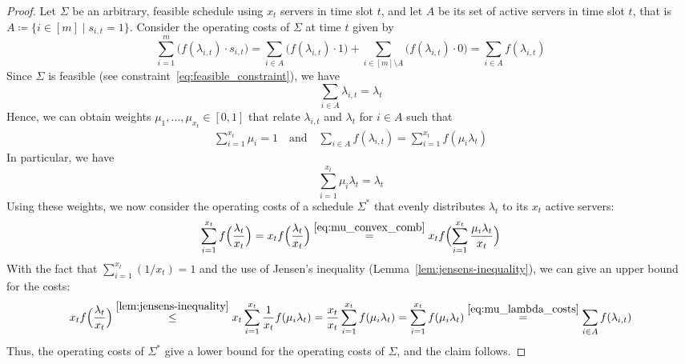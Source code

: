 \begin{proof}
Let $\Sigma$ be an arbitrary, feasible schedule using $x_t$ servers in time slot $t$, and let $A$ be its set of active servers in time slot $t$, that is $A\coloneqq\{i\in[m]\mid s_{i,t}=1\}$.
Consider the operating costs of $\Sigma$ at time $t$ given by
\begin{equation*}
	\sum\limits_{i=1}^{m}\bigl(f(\lambda_{i,t})\cdot s_{i,t}\bigr)=\sum\limits_{i\in A}\bigl(f(\lambda_{i,t})\cdot1\bigr)+\sum\limits_{i\in [m]\setminus A}\bigl(f(\lambda_{i,t})\cdot0\bigr)=\sum\limits_{i\in A}f(\lambda_{i,t})
\end{equation*}
Since $\Sigma$ is feasible (see constraint~\eqref{eq:feasible_constraint}), we have 
\begin{equation*}
	\sum\limits_{i\in A}\lambda_{i,t}=\lambda_t
\end{equation*}
Hence, we can obtain weights $\mu_1,\ldots,\mu_{x_t}\in[0,1]$ that relate $\lambda_{i,t}$ and $\lambda_t$ for $i\in A$ such that
\begin{align}
	\sum\limits_{i=1}^{x_t}\mu_i=1\quad\text{and}\quad \sum\limits_{i\in A}f(\lambda_{i,t})=\sum\limits_{i=1}^{x_t}f(\mu_i\lambda_t)\label{eq:mu_lambda_costs}
\end{align}
In particular, we have 
\begin{equation}
	\sum_{i=1}^{x_t}\mu_i\lambda_t=\lambda_t\label{eq:mu_convex_comb}
\end{equation}
Using these weights, we now consider the operating costs of a schedule $\Sigma^*$ that evenly distributes $\lambda_t$ to its $x_t$ active servers:
\begin{align*}
	\sum\limits_{i=1}^{x_t}f\Bigl(\frac{\lambda_t}{x_t}\Bigr)=x_tf\Bigl(\frac{\lambda_t}{x_t}\Bigr)\stackrel{\eqref{eq:mu_convex_comb}}{=}x_tf\Bigl(\sum\limits_{i=1}^{x_t}{\frac{\mu_i\lambda_t}{x_t}}\Bigr)
\end{align*}
With the fact that $\sum_{i=1}^{x_t}(1/x_t)=1$ and the use of Jensen's inequality (Lemma~\ref{lem:jensens-inequality}), we can give an upper bound for the costs:
\begin{align*}
	x_tf\Bigl(\frac{\lambda_t}{x_t}\Bigr)\stackrel{\ref{lem:jensens-inequality}}{\le}x_t\sum\limits_{i=1}^{x_t}\frac{1}{x_t}f(\mu_i\lambda_t)=\frac{x_t}{x_t}\sum\limits_{i=1}^{x_t}f(\mu_i\lambda_t)=\sum\limits_{i=1}^{x_t}f(\mu_i\lambda_t)\stackrel{\eqref{eq:mu_lambda_costs}}{=}\sum\limits_{i\in A}f(\lambda_{i,t})
\end{align*}
Thus, the operating costs of $\Sigma^*$ give a lower bound for the operating costs of $\Sigma$, and the claim follows.
\end{proof}
